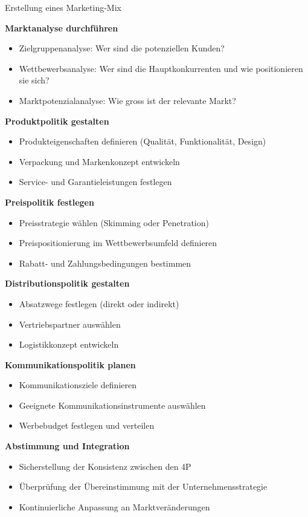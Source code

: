 \begin{KR}{Erstellung eines Marketing-Mix}

    \begin{minipage}{0.5\linewidth}
\textbf{Marktanalyse durchführen}
\begin{itemize}
    \item Zielgruppenanalyse: Wer sind die potenziellen Kunden?
    \item Wettbewerbsanalyse: Wer sind die Hauptkonkurrenten und wie positionieren sie sich?
    \item Marktpotenzialanalyse: Wie gross ist der relevante Markt?
\end{itemize}

\textbf{Produktpolitik gestalten}
\begin{itemize}
    \item Produkteigenschaften definieren (Qualität, Funktionalität, Design)
    \item Verpackung und Markenkonzept entwickeln
    \item Service- und Garantieleistungen festlegen
\end{itemize}

\textbf{Preispolitik festlegen}
\begin{itemize}
    \item Preisstrategie wählen (Skimming oder Penetration)
    \item Preispositionierung im Wettbewerbsumfeld definieren
    \item Rabatt- und Zahlungsbedingungen bestimmen
\end{itemize}
\end{minipage}
\begin{minipage}{0.5\linewidth}
\textbf{Distributionspolitik gestalten}
\begin{itemize}
    \item Absatzwege festlegen (direkt oder indirekt)
    \item Vertriebspartner auswählen
    \item Logistikkonzept entwickeln
\end{itemize}

\textbf{Kommunikationspolitik planen}
\begin{itemize}
    \item Kommunikationsziele definieren
    \item Geeignete Kommunikationsinstrumente auswählen
    \item Werbebudget festlegen und verteilen
\end{itemize}

\textbf{Abstimmung und Integration}
\begin{itemize}
    \item Sicherstellung der Konsistenz zwischen den 4P
    \item Überprüfung der Übereinstimmung mit der Unternehmensstrategie
    \item Kontinuierliche Anpassung an Marktveränderungen
\end{itemize}
\end{minipage}
\end{KR}

